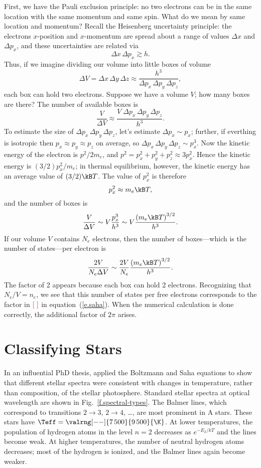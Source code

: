 First, we have the Pauli exclusion principle: no two electrons can be in the same location with the same momentum and same spin. What do we mean by same location and momentum?  Recall the Heisenberg uncertainty principle: the electrons $x$-position and $x$-momentum are spread about a range of values $\Delta x$ and $\Delta p_{x}$, and these uncertainties are related via
\[ \Delta x\,\Delta p_{x} \gtrsim h. \]
Thus, if we imagine dividing our volume into little boxes of volume
\[ 
 \Delta V = \Delta x\,\Delta y\,\Delta z \approx \frac{h^{3}}{\Delta p_{x}\,\Delta p_{y}\,\Delta p_{z}},
\]
each box can hold two electrons. Suppose we have a volume $V$; how many boxes are there?  The number of available boxes is
\[
	\frac{V}{\Delta V} \approx \frac{V\;\Delta p_{x}\,\Delta p_{y}\,\Delta p_{z}}{h^{3}}.
\]
To estimate the size of $\Delta p_{x}\,\Delta p_{y}\,\Delta p_{z}$, let's estimate $\Delta p_{x}\sim p_{x}$; further, if everthing is isotropic then $p_{x}\approx p_{y}\approx p_{z}$ on average, so $\Delta p_{x}\,\Delta p_{y}\,\Delta p_{z} \sim p_{x}^{3}$.  Now the kinetic energy of the electron is $p^{2}/2m_{e}$, and $p^{2} = p_{x}^{2} + p_{y}^{2} + p_{z}^{2} \approx 3 p_{x}^{2}$. Hence the kinetic energy is $(3/2)p_{x}^{2}/m_{e}$; in thermal equilibrium, however, the kinetic energy has an average value of $(3/2)\kB T$.  The value of $p_{x}^{2}$ is therefore
\[
	p_{x}^{2} \approx m_{e}\kB T,
\]
and the number of boxes is
\[
	\frac{V}{\Delta V} \sim V\frac{p_{x}^{3}}{h^{3}} \sim V\frac{\left(m_{e}\kB T\right)^{3/2}}{h^{3}}.
\]
If our volume $V$ contains $N_{e}$ electrons, then the number of boxes---which is the number of states---per electron is
\[
	\frac{2V}{N_{e}\Delta V} \sim \frac{2V}{N_{e}}\frac{\left(m_{e}\kB T\right)^{3/2}}{h^{3}}.
\]
The factor of 2 appears because each box can hold 2 electrons.  Recognizing that $N_{e}/V = n_{e}$, we see that this number of states per free electrons corresponds to the factor in $\color{red}\left[\;\right]$ in equation~(\ref{e.saha}). When the numerical calculation is done correctly, the additional factor of $2\pi$ arises.

\section{Classifying Stars}

In an influential PhD thesis,  applied the Boltzmann and Saha equations to show that different stellar spectra were consistent with changes in temperature, rather than composition, of the stellar photosphere.  Standard stellar spectra at optical wavelength are shown in Fig.~\ref{f.spectral-types}.  The Balmer lines, which correspond to transitions $2\to3$, $2\to 4$, \ldots, are most prominent in A stars.  These stars have $\Teff = \valrng[--]{7\,500}{9\,500}{\K}$. At lower temperatures, the population of hydrogen atoms in the level $n=2$ decreases as $e^{-E_{2}/kT}$ and the lines become weak.  At higher temperatures, the number of neutral hydrogen atoms decreases; most of the hydrogen is ionized, and the Balmer lines again become weaker.

